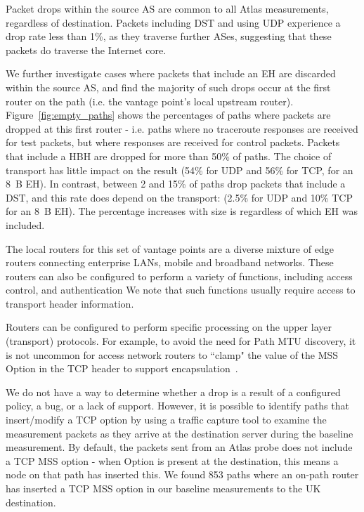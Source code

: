\documentclass[conference]{IEEEtran}
\begin{document}
Packet drops within the source AS are common to all Atlas measurements, regardless of destination. Packets including DST and using UDP experience a drop rate less than 1\%, as they traverse further  ASes, suggesting that these packets do traverse the Internet core.

We further investigate cases where packets that include an EH are discarded within the source AS, and find the majority of such drops occur at the first router on the path (i.e. the vantage point's local upstream router).
Figure~\ref{fig:empty_paths} shows the percentages of paths where packets are dropped at this first router - i.e. paths where no traceroute responses are received for test packets, but where responses are received for control packets. Packets that include a HBH are dropped for more than 50\% of paths. The choice of transport has little impact on the result (54\% for UDP and 56\% for TCP, for an 8~B EH). In contrast, between 2 and 15\% of paths drop packets that include a DST, and this rate does depend on the transport: (2.5\% for UDP and 10\% TCP for an 8~B EH). The percentage increases with size  is regardless of which EH was included.


The local routers for this set of vantage points are a diverse mixture of edge routers connecting enterprise LANs, mobile and broadband networks. These routers can also be configured to perform a variety of functions, including access control, and authentication We note that such functions usually require access to transport header information. 

Routers can be configured to perform specific processing on the upper layer (transport) protocols. For example, to avoid the need for Path MTU discovery, it is not uncommon for access network routers to ``clamp" the value of the MSS Option in the TCP header to support encapsulation~\cite{custura-mtu}. 


We do not have a way to determine whether a drop is a result of a configured policy, a bug, or a lack of support. 
However, it is possible to identify paths that insert/modify a TCP option by using a traffic capture tool to examine the measurement packets as they arrive at the destination server during the baseline measurement. By default, the packets sent from an Atlas probe does not include a TCP MSS option - when Option is present at the destination, this means a node on that path has inserted this. We found 853 paths where an on-path router has inserted a TCP MSS option in our baseline measurements to the UK destination. 
\end{document}

